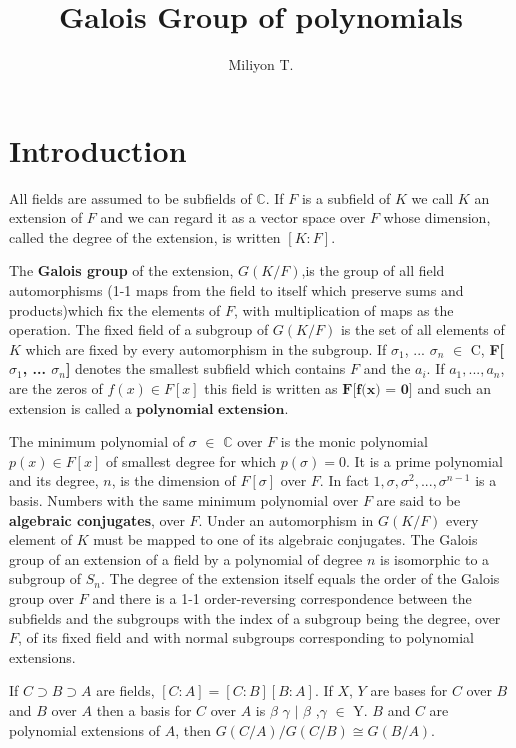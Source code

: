 \documentclass[12pt]{article}
\theoremstyle{definition}
\theoremstyle{remark}
\begin{document}
\nocite{AAU}

\title{Galois Group of polynomials}

\author{Miliyon T.}
\date{}
\maketitle

\section{Introduction}

All fields are assumed to be subfields of $\mathbb{C}$. If $F$ is a subfield of $K$ we call $K$ an extension of $F$ and we can regard it as a vector space over $F$ whose dimension, called the degree of the extension, is written $[K:F]$.

\quad The \textbf{Galois group} of the extension, $G(K/F)$,is the group of all field automorphisms (1-1 maps from the field to itself which preserve sums and products)which fix the elements of $F$, with multiplication of maps as the operation. The fixed field of a subgroup of $G(K/F)$ is the set of all elements of $K$ which are fixed by every automorphism in the subgroup.
If $\sigma_{1}$, ... $\sigma_{n}$ $\in$ C, \textbf{F[$\sigma_{1}$, ... $\sigma_{n}$]} denotes the smallest subfield which contains $F$ and the $a_i$. If $a_1, ... ,a_n$, are the zeros of $f(x) \in  F[x]$ this field is written as $\textbf{F[f(x) = 0]}$ and such an extension is called a $\textbf{polynomial extension}$.


The minimum polynomial of $\sigma$ $\in$ $\mathbb{C}$ over $F$ is the monic polynomial $p(x) \in F[x]$ of smallest degree for which $p(\sigma) = 0$. It is a prime polynomial and its degree, $n$, is the dimension of $F[\sigma]$ over $F$. In fact $1, \sigma, \sigma^{2}, ... , \sigma^{n-1}$ is a basis.
Numbers with the same minimum polynomial over $F$ are said to be \textbf{algebraic conjugates}, over $F$. Under an automorphism in $G(K/F)$ every element of $K$ must be mapped to one of its algebraic conjugates. The Galois group of an extension of a field by a polynomial of degree $n$ is isomorphic to a subgroup of $S_{n}$. The degree of the extension itself equals the order of the Galois group over $F$ and there is a 1-1 order-reversing correspondence between the subfields and the subgroups with the index of a subgroup being the degree, over $F$, of its fixed field and with normal subgroups corresponding to polynomial extensions.


If $C\supset B\supset A$ are fields, $[C:A ]=[C:B][B:A]$. If $X$, $Y$ are bases for $C$ over $B$ and $B$ over $A$ then a basis for $C$ over $A$ is {$\beta$ $\gamma$ $|$ $\beta$ ,$\gamma$ $\in$ Y}. $B$ and $C$ are polynomial extensions of $A$, then $G(C/A)/G(C/B) \cong G(B/A)$.
\end{document}
